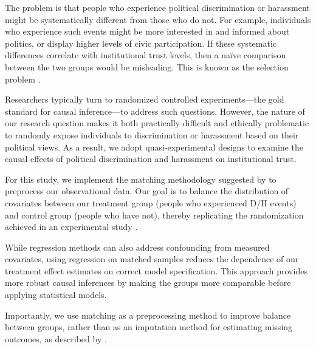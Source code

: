 \documentclass{article}
\begin{document}
The problem is that people who experience political discrimination or harassment might be systematically different from those who do not. For example, individuals who experience such events might be more interested in and informed about politics, or display higher levels of civic participation. If these systematic differences correlate with institutional trust levels, then a naïve comparison between the two groups would be misleading. This is known as the selection problem \parencite{angrist_mostly_2009}.

Researchers typically turn to randomized controlled experiments—the gold standard for causal inference—to address such questions. However, the nature of our research question makes it both practically difficult and ethically problematic to randomly expose individuals to discrimination or harassment based on their political views. As a result, we adopt quasi-experimental designs to examine the causal effects of political discrimination and harassment on institutional trust.

For this study, we implement the matching methodology suggested by \textcite{ho_matching_2007} to preprocess our observational data. Our goal is to balance the distribution of covariates between our treatment group (people who experienced D/H events) and control group (people who have not), thereby replicating the randomization achieved in an experimental study \parencite{stuart_matching_2010}.

While regression methods can also address confounding from measured covariates, using regression on matched samples reduces the dependence of our treatment effect estimates on correct model specification. This approach provides more robust causal inferences by making the groups more comparable before applying statistical models.

Importantly, we use matching as a preprocessing method to improve balance between groups, rather than as an imputation method for estimating missing outcomes, as described by \textcite{abadie_large_2006, abadie_matching_2016}.
\end{document}
